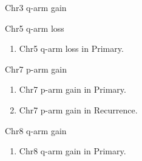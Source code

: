 \documentclass{beamer}
\begin{document}
\begin{frame}[allowframebreaks]
\begin{block}{Chr3 q-arm gain}
            \begin{table}
                \caption{CGC Tier1 genes in Chr3 q-arm}
                \resizebox{\linewidth}{!}
                {}
            \end{table}
        \end{block}

        \begin{block}{Chr5 q-arm loss}
            \begin{enumerate}
                \item Chr5 q-arm loss in Primary.
            \end{enumerate}

            \begin{table}
                \caption{CGC Tier1 genes in Chr5 q-arm}
                \resizebox{\linewidth}{!}
                {}
            \end{table}
        \end{block}

        \begin{block}{Chr7 p-arm gain}
            \begin{enumerate}
                \item Chr7 p-arm gain in Primary.
                \item Chr7 p-arm gain in Recurrence.
            \end{enumerate}

            \begin{table}
                \caption{CGC Tier1 genes in Chr7 p-arm}
                \resizebox{\linewidth}{!}
                {}
            \end{table}
        \end{block}

        \begin{block}{Chr8 q-arm gain}
            \begin{enumerate}
                \item Chr8 q-arm gain in Primary.
            \end{enumerate}

            \begin{table}
                \caption{CGC Tier1 genes in Chr8 q-arm}
                \resizebox{\linewidth}{!}
                {}
            \end{table}
        \end{block}


\end{frame}
\end{document}
